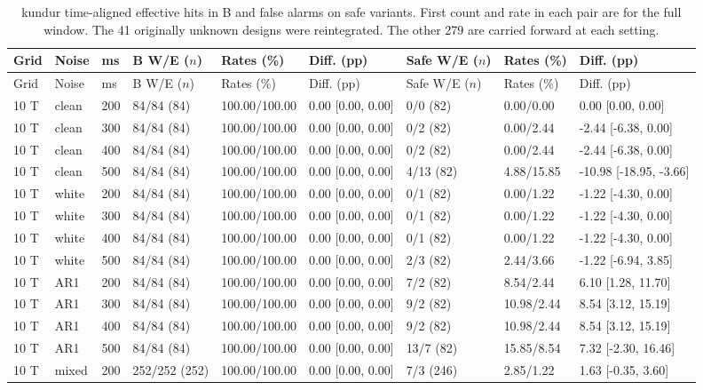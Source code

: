 \documentclass[10pt]{article}
\begin{document}
\begin{longtable}{@{}lllllllll@{}}
\caption{kundur time-aligned effective hits in B and false alarms on safe variants. First count and rate in each pair are for the full window. The 41 originally unknown designs were reintegrated. The other 279 are carried forward at each setting.}\label{tab:r2kundur}\\
\toprule Grid & Noise & ms & B W/E ($n$) & Rates (\%) & Diff. (pp) & Safe W/E ($n$) & Rates (\%) & Diff. (pp) \\\midrule\endfirsthead
\toprule Grid & Noise & ms & B W/E ($n$) & Rates (\%) & Diff. (pp) & Safe W/E ($n$) & Rates (\%) & Diff. (pp) \\\midrule\endhead
10 T & clean & 200 & 84/84 (84) & 100.00/100.00 & 0.00 [0.00, 0.00] & 0/0 (82) & 0.00/0.00 & 0.00 [0.00, 0.00] \\
10 T & clean & 300 & 84/84 (84) & 100.00/100.00 & 0.00 [0.00, 0.00] & 0/2 (82) & 0.00/2.44 & -2.44 [-6.38, 0.00] \\
10 T & clean & 400 & 84/84 (84) & 100.00/100.00 & 0.00 [0.00, 0.00] & 0/2 (82) & 0.00/2.44 & -2.44 [-6.38, 0.00] \\
10 T & clean & 500 & 84/84 (84) & 100.00/100.00 & 0.00 [0.00, 0.00] & 4/13 (82) & 4.88/15.85 & -10.98 [-18.95, -3.66] \\
10 T & white & 200 & 84/84 (84) & 100.00/100.00 & 0.00 [0.00, 0.00] & 0/1 (82) & 0.00/1.22 & -1.22 [-4.30, 0.00] \\
10 T & white & 300 & 84/84 (84) & 100.00/100.00 & 0.00 [0.00, 0.00] & 0/1 (82) & 0.00/1.22 & -1.22 [-4.30, 0.00] \\
10 T & white & 400 & 84/84 (84) & 100.00/100.00 & 0.00 [0.00, 0.00] & 0/1 (82) & 0.00/1.22 & -1.22 [-4.30, 0.00] \\
10 T & white & 500 & 84/84 (84) & 100.00/100.00 & 0.00 [0.00, 0.00] & 2/3 (82) & 2.44/3.66 & -1.22 [-6.94, 3.85] \\
10 T & AR1 & 200 & 84/84 (84) & 100.00/100.00 & 0.00 [0.00, 0.00] & 7/2 (82) & 8.54/2.44 & 6.10 [1.28, 11.70] \\
10 T & AR1 & 300 & 84/84 (84) & 100.00/100.00 & 0.00 [0.00, 0.00] & 9/2 (82) & 10.98/2.44 & 8.54 [3.12, 15.19] \\
10 T & AR1 & 400 & 84/84 (84) & 100.00/100.00 & 0.00 [0.00, 0.00] & 9/2 (82) & 10.98/2.44 & 8.54 [3.12, 15.19] \\
10 T & AR1 & 500 & 84/84 (84) & 100.00/100.00 & 0.00 [0.00, 0.00] & 13/7 (82) & 15.85/8.54 & 7.32 [-2.30, 16.46] \\
10 T & mixed & 200 & 252/252 (252) & 100.00/100.00 & 0.00 [0.00, 0.00] & 7/3 (246) & 2.85/1.22 & 1.63 [-0.35, 3.60] \\

\end{longtable}
\end{document}
